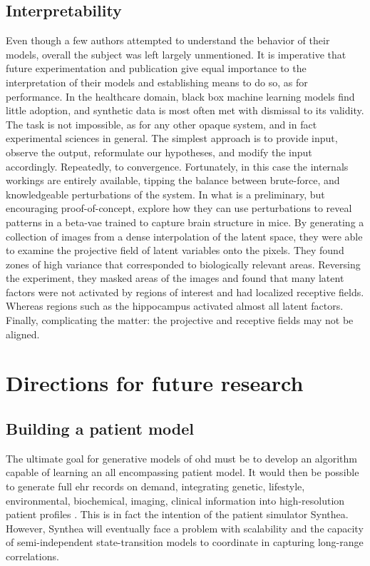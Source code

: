 \subsection{Interpretability}
Even though a few authors attempted to understand the behavior of their models, overall the subject was left largely unmentioned. It is imperative that future experimentation and publication give equal importance to the interpretation of their models and establishing means to do so, as for performance. In the healthcare domain, black box machine learning models find little adoption, and synthetic data is most often met with dismissal to its validity. The task is not impossible, as for any other opaque system, and in fact experimental sciences in general. The simplest approach is to  provide input, observe the output, reformulate our hypotheses, and modify the input accordingly. Repeatedly, to convergence. Fortunately, in this case the internals workings are entirely available, tipping the balance between brute-force, and knowledgeable perturbations of the system. In what is a preliminary, but encouraging proof-of-concept, \cite{lui2019-latent} explore how they can use perturbations to reveal patterns in a \gls{beta-vae} trained to capture brain structure in mice. By generating a collection of images from a dense interpolation of the latent space, they were able to examine the projective field of latent variables onto the pixels. They found zones of high variance that corresponded to biologically relevant areas. Reversing the experiment, they masked areas of the images and found that many latent factors were not activated by regions of interest and had localized receptive fields. Whereas regions such as the hippocampus activated almost all latent factors. Finally, complicating the matter: the projective and receptive fields may not be aligned.

\section{Directions for future research}
\subsection{Building a patient model}
The ultimate goal for generative models of \gls{ohd} must be to develop an algorithm capable of learning an all encompassing patient model. It would then be possible to generate full \gls{ehr} records on demand, integrating genetic, lifestyle, environmental, biochemical, imaging, clinical information into high-resolution patient profiles \cite{Capobianco2020}. This is in fact the intention of the patient simulator Synthea. However, Synthea will eventually face a problem with scalability and the capacity of semi-independent state-transition models to coordinate in capturing long-range correlations.\par


